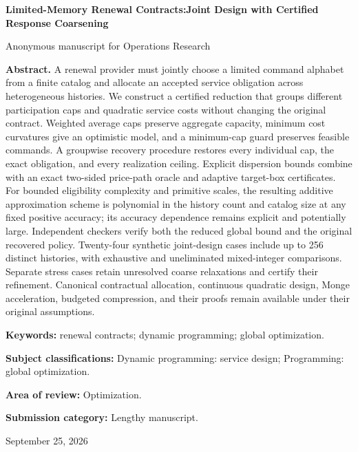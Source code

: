 \documentclass[11pt,letterpaper]{article}
\theoremstyle{definition}\newtheorem{assumption}[theorem]{Assumption}
\begin{document}
\hypersetup{pageanchor=false}
\begin{titlepage}\centering
{\Large\bfseries Limited-Memory Renewal Contracts:\newline Joint Design with Certified Response Coarsening\par}
\vspace{.3in}Anonymous manuscript for Operations Research\par\vspace{.2in}
\begin{minipage}{\textwidth}\textbf{Abstract.} A renewal provider must jointly choose a limited command alphabet from a finite catalog and allocate an accepted service obligation across heterogeneous histories. We construct a certified reduction that groups different participation caps and quadratic service costs without changing the original contract. Weighted average caps preserve aggregate capacity, minimum cost curvatures give an optimistic model, and a minimum-cap guard preserves feasible commands. A groupwise recovery procedure restores every individual cap, the exact obligation, and every realization ceiling. Explicit dispersion bounds combine with an exact two-sided price-path oracle and adaptive target-box certificates. For bounded eligibility complexity and primitive scales, the resulting additive approximation scheme is polynomial in the history count and catalog size at any fixed positive accuracy; its accuracy dependence remains explicit and potentially large. Independent checkers verify both the reduced global bound and the original recovered policy. Twenty-four synthetic joint-design cases include up to 256 distinct histories, with exhaustive and uneliminated mixed-integer comparisons. Separate stress cases retain unresolved coarse relaxations and certify their refinement. Canonical contractual allocation, continuous quadratic design, Monge acceleration, budgeted compression, and their proofs remain available under their original assumptions.
\par\vspace{.15in}\textbf{Keywords:} renewal contracts; dynamic programming; global optimization.
\par\vspace{.1in}\textbf{Subject classifications:} Dynamic programming: service design; Programming: global optimization.
\par\vspace{.1in}\textbf{Area of review:} Optimization.
\par\vspace{.1in}\textbf{Submission category:} Lengthy manuscript.
\end{minipage}\vfill September 25, 2026\end{titlepage}
\end{document}
